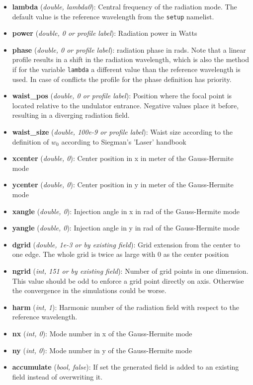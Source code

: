 \documentclass[12pt]{book}
\begin{document}
\begin{itemize}
\item {\bf lambda} ({\it double, lambda0}): Central frequency of the radiation mode. The default value is the reference wavelength from the {\tt setup} namelist.
\item {\bf power} ({\it double, 0 or profile label}): Radiation power in Watts
\item {\bf phase} ({\it double, 0 or profile label}): radiation phase in rads. Note that a linear profile results in a shift in the radiation wavelength, which is also the method if for the variable {\tt lambda} a different value than the reference wavelength is used. In case of conflicts the profile for the phase definition has priority.
\item {\bf waist\_pos} ({\it double, 0 or profile label}): Position where the focal point is located relative to the undulator entrance. Negative values place it before, resulting in a diverging radiation field.
\item {\bf waist\_size} ({\it double, 100e-9 or profile label}): Waist size according to the definition of $w_0$ according to Siegman's 'Laser' handbook
\item {\bf xcenter} ({\it double, 0}): Center position in x in meter of the Gauss-Hermite mode
\item {\bf ycenter} ({\it double, 0}): Center position in y in meter of the Gauss-Hermite mode
\item {\bf xangle} ({\it double, 0}): Injection angle in x in rad of the Gauss-Hermite mode
\item {\bf yangle} ({\it double, 0}): Injection angle in y in rad of the Gauss-Hermite mode
\item {\bf dgrid} ({\it double, 1e-3 or by existing field}): Grid extension from the center to one edge. The whole grid is twice as large with 0 as the center position
\item {\bf ngrid} ({\it int, 151 or by existing field}): Number of grid points in one dimension. This value should be odd to enforce a grid point directly on axis. Otherwise the convergence in the simulations could be worse.
\item {\bf harm} ({\it int, 1}): Harmonic number of the radiation field with respect to the reference wavelength.
\item {\bf nx} ({\it int, 0}): Mode number in x of the Gauss-Hermite mode
\item {\bf ny} ({\it int, 0}): Mode number in y of the Gauss-Hermite mode
\item {\bf accumulate} ({\it bool, false}): If set the generated field is added to an existing field instead of overwriting it.
\end{itemize}
\end{document}
